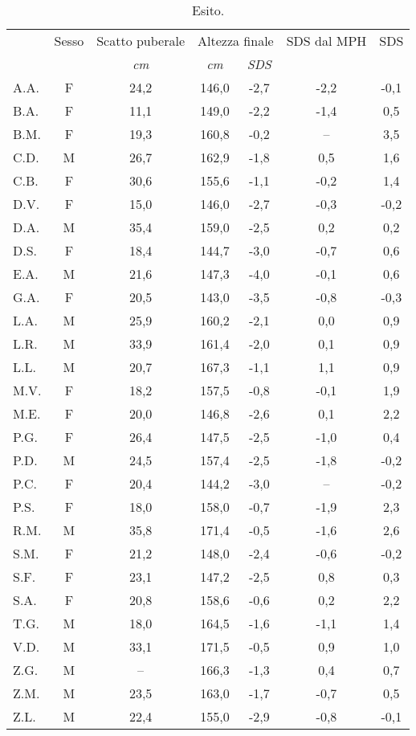 \begin{table}[!h]
\begin{center}
\begin{tabular}{lcccccc}
\toprule
 & Sesso  & Scatto puberale & \multicolumn{2}{c}{Altezza finale} 	& SDS dal MPH	& \Delta SDS \\
\cmidrule(r){4-5}
  & & \emph{cm} & \emph{cm} 	& \emph{SDS}  	   	&		& 			 	\\
\midrule
A.A.	& F & 24,2 & 146,0 & -2,7  & -2,2  & -0,1    \\
B.A.	& F & 11,1 & 149,0 & -2,2  & -1,4  & 0,5     \\
B.M.	& F & 19,3 & 160,8 & -0,2  & --    & 3,5     \\
C.D.	& M & 26,7 & 162,9 & -1,8  & 0,5   & 1,6     \\
C.B.	& F & 30,6 & 155,6 & -1,1  & -0,2  & 1,4     \\
D.V.	& F & 15,0 & 146,0 & -2,7  & -0,3  & -0,2    \\
D.A.	& M & 35,4 & 159,0 & -2,5  & 0,2   & 0,2      \\
D.S.	& F & 18,4 & 144,7 & -3,0  & -0,7  & 0,6     \\
E.A.	& M & 21,6 & 147,3 & -4,0  & -0,1  & 0,6     \\
G.A.	& F & 20,5 & 143,0 & -3,5  & -0,8  & -0,3        \\
L.A.	& M & 25,9 & 160,2 & -2,1  & 0,0   & 0,9     \\
L.R.	& M & 33,9 & 161,4 & -2,0  & 0,1   & 0,9     \\
L.L.	& M & 20,7 & 167,3 & -1,1  & 1,1   & 0,9     \\
M.V.	& F & 18,2 & 157,5 & -0,8  & -0,1  & 1,9     \\
M.E.	& F & 20,0 & 146,8 & -2,6  & 0,1   & 2,2     \\
P.G.	& F & 26,4 & 147,5 & -2,5  & -1,0  & 0,4     \\
P.D.	& M & 24,5 & 157,4 & -2,5  & -1,8  & -0,2    \\
P.C.	& F & 20,4 & 144,2 & -3,0  & --  & -0,2   \\
P.S.	& F & 18,0 & 158,0 & -0,7  & -1,9  & 2,3     \\
R.M.	& M & 35,8 & 171,4 & -0,5  & -1,6  & 2,6    \\
S.M.	& F & 21,2 & 148,0 & -2,4  & -0,6  & -0,2    \\
S.F.	& F & 23,1 & 147,2 & -2,5  & 0,8   & 0,3     \\
S.A.	& F & 20,8 & 158,6 & -0,6  & 0,2   & 2,2     \\
T.G.    & M & 18,0 & 164,5 & -1,6  & -1,1  & 1,4    \\
V.D.	& M & 33,1 & 171,5 & -0,5  & 0,9   & 1,0     \\
Z.G.	& M & --   & 166,3 & -1,3  & 0,4   & 0,7   \\
Z.M.	& M & 23,5 & 163,0 & -1,7  & -0,7  & 0,5     \\
Z.L.	& M & 22,4 & 155,0 & -2,9  & -0,8  & -0,1    \\
\bottomrule
\end{tabular}
\end{center}
\caption{Esito.}
\label{tab:Esito}
\end{table}


